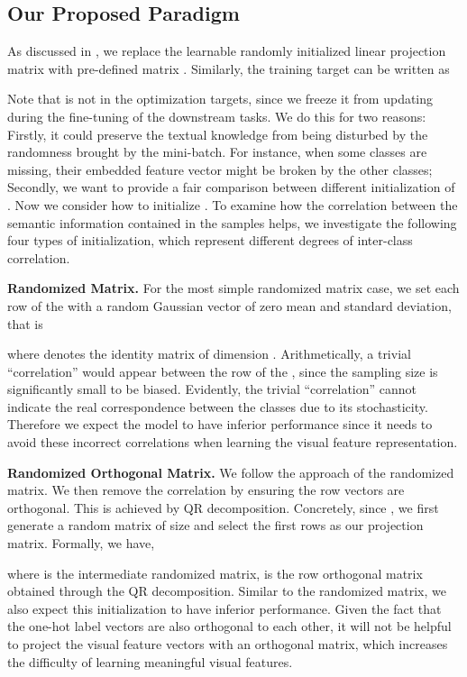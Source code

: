 \documentclass[letterpaper]{article} \usepackage{aaai23}  \usepackage{times}  \usepackage{helvet}  \usepackage{courier}  \usepackage[hyphens]{url}  \usepackage{graphicx} \urlstyle{rm} \def\UrlFont{\rm}  \usepackage{natbib}  \usepackage{caption} \frenchspacing  \setlength{\pdfpagewidth}{8.5in}  \setlength{\pdfpageheight}{11in}  \usepackage{algorithm}
\begin{document}
\subsection{Our Proposed Paradigm}\label{sec:ours}
As discussed in , we replace the learnable randomly initialized linear projection matrix  with pre-defined matrix . Similarly, the training target can be written as 

Note that  is not in the optimization targets, since we freeze it from updating during the fine-tuning of the downstream tasks. We do this for two reasons: Firstly, it could preserve the textual knowledge from being disturbed by the randomness brought by the mini-batch. For instance, when some classes are missing, their embedded feature vector might be broken by the other classes; Secondly, we want to provide a fair comparison between different initialization of .
Now we consider how to initialize . To examine how the correlation between the semantic information contained in the samples helps, we investigate the following four types of initialization, which represent different degrees of inter-class correlation. 

\textbf{Randomized Matrix.}
For the most simple randomized matrix case, we set each row of the  with a random Gaussian vector of zero mean and standard deviation, that is

where  denotes the identity matrix of dimension . Arithmetically, a trivial ``correlation'' would appear between the row of the , since the sampling size is significantly small to be biased. Evidently, the trivial ``correlation'' cannot indicate the real correspondence between the classes due to its stochasticity. Therefore we expect the model to have inferior performance since it needs to avoid these incorrect correlations when learning the visual feature representation.


\textbf{Randomized Orthogonal Matrix.}
We follow the approach of the randomized matrix. We then remove the correlation by ensuring the row vectors are orthogonal. This is achieved by QR decomposition. Concretely, since , we first generate a random matrix of size  and select the first  rows as our projection matrix. Formally, we have,

where  is the intermediate randomized matrix,  is the row orthogonal matrix obtained through the QR decomposition.
Similar to the randomized matrix, we also expect this initialization to have inferior performance. Given the fact that the one-hot label vectors are also orthogonal to each other, it will not be helpful to project the visual feature vectors with an orthogonal matrix, which increases the difficulty of learning meaningful visual features.
\end{document}
